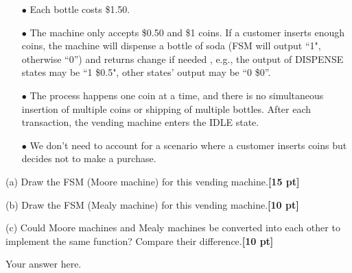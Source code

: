\documentclass[a4paper]{article}
\begin{document}
\begin{itemize}
\item[$\bullet$] Each bottle costs \$1.50. 
\item[$\bullet$] The machine only accepts \$0.50 and \$1 coins. If a customer inserts enough coins, the machine will dispense a bottle of soda (FSM will output ``1", otherwise ``0'') and returns change if needed , e.g., the output of DISPENSE states may be ``1 \$0.5", other states' output may be ``0 \$0''.
\item[$\bullet$] The process happens one coin at a time, and there is no simultaneous insertion of multiple coins or shipping of multiple bottles. After each transaction, the vending machine enters the IDLE state.
\item[$\bullet$] We don’t need to account for a scenario where a customer inserts coins but decides not to make a purchase.
\end{itemize}


(a) Draw the FSM (Moore machine) for this vending machine.\textbf{[15 pt]}

(b) Draw the FSM (Mealy machine) for this vending machine.\textbf{[10 pt]}

(c) Could Moore machines and Mealy machines be converted into each other to implement the same function? Compare their difference.\textbf{[10 pt]}
\begin{answer}[Question 3]
        Your answer here.
\end{answer}
\end{document}
